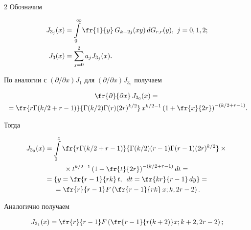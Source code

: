 \begin{multicols}{2}
Обозначим


\begin{align*}


 J_{3_j}(x) &= \int\limits^{\infty}_{0} \fr{1}{y}\,G_{k+2j}(xy)\,dG_{r,r}(y), \


  j = 0,1,2; \\


   J_3(x)&= \sum\limits_{j=0}^{2} a_j  J_{3_j}(x).


 \end{align*}





По аналогии с $({\partial}/{\partial x})J_{1}$ для $({\partial}/{\partial x})J_{3_0}$ получаем


\begin{multline*}


\fr{\partial}{\partial x}\,J_{3_0}(x) = {}\\


{}=


\fr{r \Gamma(k/2+r-1)}{\Gamma(k/2) 


\Gamma(r) (2r)^{k/2}}\,x^{k/2-1}\left(1+\fr{x}{2r}\right)^{-(k/2+r-1)}\!.


\end{multline*}





Тогда


\begin{multline*}


J_{3_0}(x) =\int\limits_{0}^{x} \fr{r \Gamma(k/2+r-1)}{\Gamma(k/2) 


(r-1)\Gamma(r-1) (2r)^{k/2}}\times{}\\


{}\times t^{k/2-1}\left(1+\fr{t}{2r}\right)^{-(k/2+r-1)}dt ={}\\


{}= \left\{  y = \fr{r-1}{rk}\,t, \enskip dt = \fr{kr}{r-1}\,dy  \right\} = {}\\


{}=


\fr{r}{r-1} F\left( \fr{r-1}{rk} \,x;k,2r-2\right).


\end{multline*}


Аналогично получаем


\begin{align*}


J_{3_1}(x)&=\fr{r}{r-1} F\left( \fr{r-1}{r(k+2)} x;k+2,2r-2\right);  \\



\end{align*}
\end{multicols}
